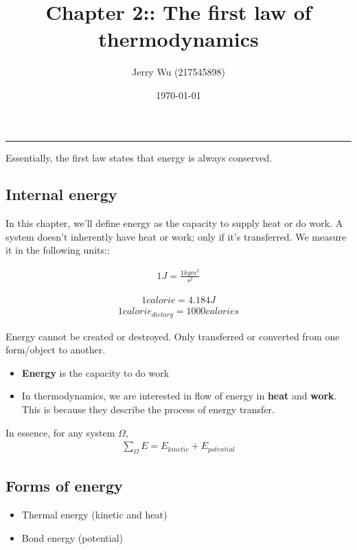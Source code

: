 \documentclass[12pt]{article}
\title{Chapter 2:: The first law of thermodynamics}
\author{Jerry Wu (217545898)}
\date{\today}
\begin{document}
\maketitle
\rule{\textwidth}{0.4pt}
Essentially, the first law states that energy is always conserved.\\

\subsection*{Internal energy}

In this chapter, we'll define energy as the capacity to supply heat or do work. A system doesn't inherently have heat or work; only if it's transferred. We measure it in the following units::

\begin{align*}
    1J=\frac{1kgm^2}{s^2}
\end{align*}

\begin{align*}
    1calorie=4.184J
\end{align*}
\begin{align*}
    1calorie_{dietary}=1000calories
\end{align*}

Energy cannot be created or destroyed. Only transferred or converted from one form/object to another.\\

\begin{itemize}
    \item \textbf{Energy} is the capacity to do work
    \item In thermodynamics, we are interested in flow of energy in \textbf{heat} and \textbf{work}. This is because they describe the process of energy transfer.
\end{itemize}

In essence, for any system $\Omega$,\\
\begin{align*}
    \sum_{\Omega}{E}=E_{kinetic} + E_{potential}
\end{align*}

\subsection*{Forms of energy}
\begin{itemize}
    \item Thermal energy (kinetic and heat)
    \item Bond energy (potential)
\end{itemize}
\end{document}

